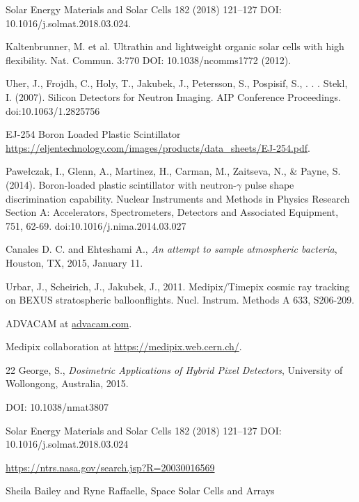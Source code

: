 \begin{thebibliography}{9}
  Solar Energy Materials and Solar Cells 182 (2018) 121–127 DOI: 10.1016/j.solmat.2018.03.024.

  Kaltenbrunner, M. et al. Ultrathin and lightweight organic solar cells with high flexibility. Nat. Commun. 3:770 DOI: 10.1038/ncomms1772 (2012).

  Uher, J., Frojdh, C., Holy, T., Jakubek, J., Petersson, S., Pospisif, S., . . . Stekl, I. (2007). Silicon Detectors for Neutron Imaging. AIP Conference Proceedings. doi:10.1063/1.2825756

  EJ-254 Boron Loaded Plastic Scintillator \url{https://eljentechnology.com/images/products/data_sheets/EJ-254.pdf}.

  Pawełczak, I., Glenn, A., Martinez, H., Carman, M., Zaitseva, N., \& Payne, S. (2014). Boron-loaded plastic scintillator with neutron-$\gamma$ pulse shape discrimination capability. Nuclear Instruments and Methods in Physics Research Section A: Accelerators, Spectrometers, Detectors and Associated Equipment, 751, 62-69. doi:10.1016/j.nima.2014.03.027
  
 Canales D. C. and Ehteshami A., \textit{An attempt to sample atmospheric bacteria}, Houston, TX, 2015, January 11.

Urbar, J., Scheirich, J., Jakubek, J., 2011. Medipix/Timepix cosmic ray tracking on BEXUS stratospheric balloonflights. Nucl. Instrum. Methods A 633, S206-209.

  ADVACAM at \url{advacam.com}.

  Medipix collaboration at \url{https://medipix.web.cern.ch/}.
  
 22
  George, S., \textit{Dosimetric Applications of Hybrid Pixel Detectors}, University of Wollongong, Australia, 2015.
  
  DOI: 10.1038/nmat3807 
  
  Solar Energy Materials and Solar Cells 182 (2018) 121–127
DOI: 10.1016/j.solmat.2018.03.024

\url{https://ntrs.nasa.gov/search.jsp?R=20030016569}

Sheila Bailey and Ryne Raffaelle, Space Solar Cells and Arrays




\end{thebibliography}
